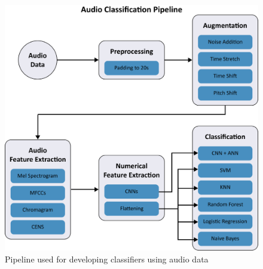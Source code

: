 \documentclass[10pt,twocolumn,letterpaper]{article}
\begin{document}
\begin{figure}
    \includegraphics[scale=0.19]{Audio Pipeline.png}
    \caption{Pipeline used for developing classifiers using audio data}
    \label{fig:audio_pipeline}
\end{figure}
\end{document}
